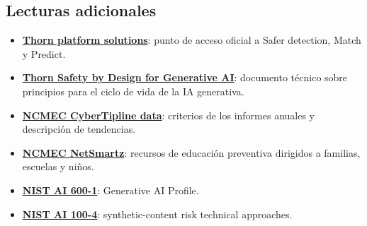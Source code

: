 \documentclass[a4paper]{article}
\begin{document}
\subsection{Lecturas adicionales}

{\small
\begin{itemize}[nosep,leftmargin=*]
  \item \href{https://www.thorn.org/solutions/for-platforms/}{\textbf{Thorn platform solutions}}: punto de acceso oficial a Safer detection, Match y Predict.
  \item \href{https://info.thorn.org/hubfs/thorn-safety-by-design-for-generative-AI.pdf}{\textbf{Thorn Safety by Design for Generative AI}}: documento técnico sobre principios para el ciclo de vida de la IA generativa.
  \item \href{https://www.missingkids.org/gethelpnow/cybertipline/cybertiplinedata}{\textbf{NCMEC CyberTipline data}}: criterios de los informes anuales y descripción de tendencias.
  \item \href{https://www.missingkids.org/netsmartz/home}{\textbf{NCMEC NetSmartz}}: recursos de educación preventiva dirigidos a familias, escuelas y niños.
  \item \href{https://nvlpubs.nist.gov/nistpubs/ai/NIST.AI.600-1.pdf}{\textbf{NIST AI 600-1}}: Generative AI Profile.
  \item \href{https://nvlpubs.nist.gov/nistpubs/ai/NIST.AI.100-4.pdf}{\textbf{NIST AI 100-4}}: synthetic-content risk technical approaches.
\end{itemize}
}
\end{document}
